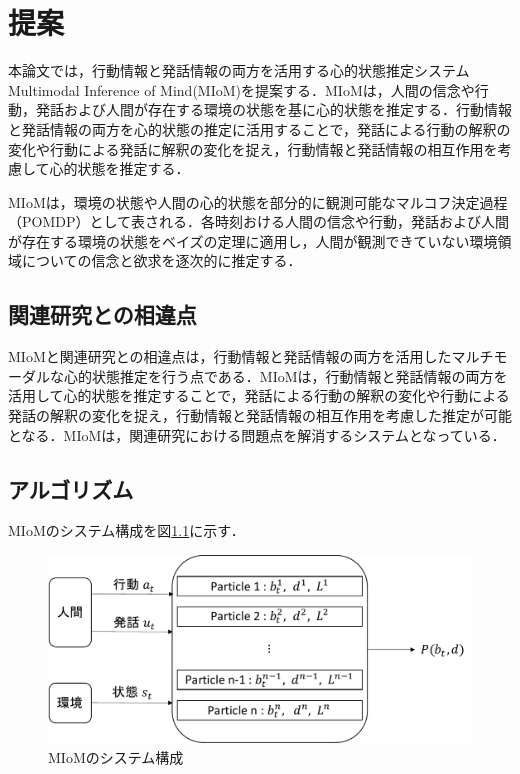 \chapter{提案}
\par
本論文では，行動情報と発話情報の両方を活用する心的状態推定システムMultimodal Inference of Mind(MIoM)を提案する．MIoMは，人間の信念や行動，発話および人間が存在する環境の状態を基に心的状態を推定する．行動情報と発話情報の両方を心的状態の推定に活用することで，発話による行動の解釈の変化や行動による発話に解釈の変化を捉え，行動情報と発話情報の相互作用を考慮して心的状態を推定する．

\par
MIoMは，環境の状態や人間の心的状態を部分的に観測可能なマルコフ決定過程（POMDP）として表される．各時刻おける人間の信念や行動，発話および人間が存在する環境の状態をベイズの定理に適用し，人間が観測できていない環境領域についての信念と欲求を逐次的に推定する．


\section{関連研究との相違点}
\par
MIoMと関連研究との相違点は，行動情報と発話情報の両方を活用したマルチモーダルな心的状態推定を行う点である．MIoMは，行動情報と発話情報の両方を活用して心的状態を推定することで，発話による行動の解釈の変化や行動による発話の解釈の変化を捉え，行動情報と発話情報の相互作用を考慮した推定が可能となる．MIoMは，関連研究における問題点を解消するシステムとなっている．


\section{アルゴリズム}
\par
MIoMのシステム構成を図\ref{fig:sys_arc}に示す．

\begin{figure}[htbp]
  \begin{center}
    \includegraphics[scale=0.85]{./bt1.pdf}
    \caption{MIoMのシステム構成}
    \label{fig:sys_arc}
  \end{center}
\end{figure}
